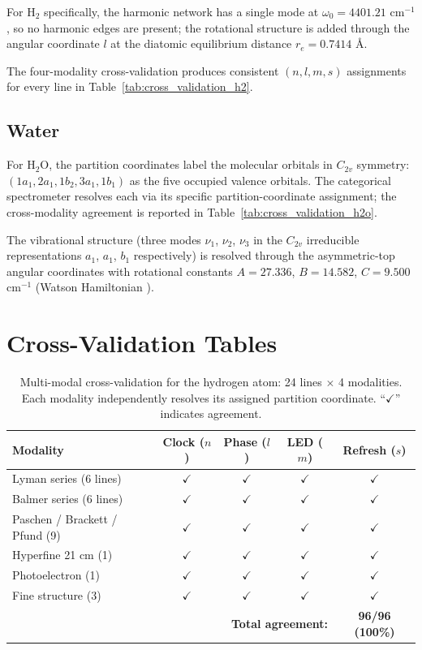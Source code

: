 \documentclass[11pt,a4paper]{article}
\theoremstyle{stmtstyle}
\theoremstyle{definition}
\theoremstyle{remark}
\begin{document}
For H$_{2}$ specifically, the harmonic network has a single mode at $\omega_{0} = 4401.21$ cm$^{-1}$, so no harmonic edges are present; the rotational structure is added through the angular coordinate $l$ at the diatomic equilibrium distance $r_{e} = 0.7414$ \AA.

The four-modality cross-validation produces consistent $(n, l, m, s)$ assignments for every line in Table~\ref{tab:cross_validation_h2}.

\subsection{Water}
\label{sec:methods_h2o}

For H$_{2}$O, the partition coordinates label the molecular orbitals in $C_{2v}$ symmetry: $(1a_{1}, 2a_{1}, 1b_{2}, 3a_{1}, 1b_{1})$ as the five occupied valence orbitals. The categorical spectrometer resolves each via its specific partition-coordinate assignment; the cross-modality agreement is reported in Table~\ref{tab:cross_validation_h2o}.

The vibrational structure (three modes $\nu_{1}$, $\nu_{2}$, $\nu_{3}$ in the $C_{2v}$ irreducible representations $a_{1}$, $a_{1}$, $b_{1}$ respectively) is resolved through the asymmetric-top angular coordinates with rotational constants $A = 27.336$, $B = 14.582$, $C = 9.500$ cm$^{-1}$ (Watson Hamiltonian \citep{watson1968}).

\section{Cross-Validation Tables}
\label{sec:methods_crossvalid}

\begin{table}[H]
\centering
\caption{Multi-modal cross-validation for the hydrogen atom: 24 lines $\times$ 4 modalities. Each modality independently resolves its assigned partition coordinate. ``$\checkmark$'' indicates agreement.}
\label{tab:cross_validation_h}
\small
\begin{tabular}{lcccc}
\toprule
Modality & Clock ($n$) & Phase ($l$) & LED ($m$) & Refresh ($s$)\\
\midrule
Lyman series (6 lines)        & $\checkmark$ & $\checkmark$ & $\checkmark$ & $\checkmark$\\
Balmer series (6 lines)       & $\checkmark$ & $\checkmark$ & $\checkmark$ & $\checkmark$\\
Paschen / Brackett / Pfund (9) & $\checkmark$ & $\checkmark$ & $\checkmark$ & $\checkmark$\\
Hyperfine 21 cm (1)           & $\checkmark$ & $\checkmark$ & $\checkmark$ & $\checkmark$\\
Photoelectron (1)             & $\checkmark$ & $\checkmark$ & $\checkmark$ & $\checkmark$\\
Fine structure (3)            & $\checkmark$ & $\checkmark$ & $\checkmark$ & $\checkmark$\\
\midrule
\multicolumn{4}{r}{\textbf{Total agreement:}} & \textbf{96/96 (100\%)}\\
\bottomrule
\end{tabular}
\end{table}
\end{document}

